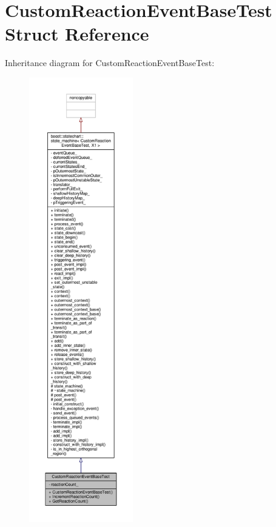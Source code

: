 \hypertarget{struct_custom_reaction_event_base_test}{}\section{Custom\+Reaction\+Event\+Base\+Test Struct Reference}
\label{struct_custom_reaction_event_base_test}


Inheritance diagram for Custom\+Reaction\+Event\+Base\+Test\+:
\nopagebreak
\begin{figure}[H]
\begin{center}
\leavevmode
\includegraphics[height=550pt]{struct_custom_reaction_event_base_test__inherit__graph}
\end{center}
\end{figure}


